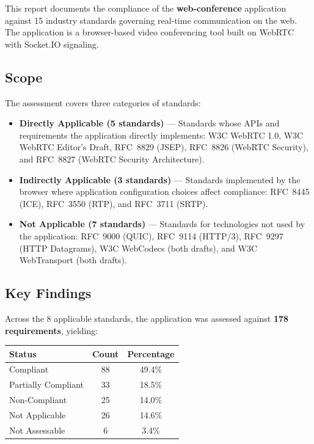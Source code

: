 \documentclass[11pt,letterpaper]{article}
\begin{document}
This report documents the compliance of the \textbf{web-conference} application against 15 industry standards governing real-time communication on the web. The application is a browser-based video conferencing tool built on WebRTC with Socket.IO signaling.

\subsection{Scope}

The assessment covers three categories of standards:

\begin{itemize}[leftmargin=2em]
    \item \textbf{Directly Applicable (5 standards)} --- Standards whose APIs and requirements the application directly implements: W3C WebRTC 1.0, W3C WebRTC Editor's Draft, RFC~8829 (JSEP), RFC~8826 (WebRTC Security), and RFC~8827 (WebRTC Security Architecture).
    \item \textbf{Indirectly Applicable (3 standards)} --- Standards implemented by the browser where application configuration choices affect compliance: RFC~8445 (ICE), RFC~3550 (RTP), and RFC~3711 (SRTP).
    \item \textbf{Not Applicable (7 standards)} --- Standards for technologies not used by the application: RFC~9000 (QUIC), RFC~9114 (HTTP/3), RFC~9297 (HTTP Datagrams), W3C WebCodecs (both drafts), and W3C WebTransport (both drafts).
\end{itemize}

\subsection{Key Findings}

Across the 8 applicable standards, the application was assessed against \textbf{178 requirements}, yielding:

\begin{center}
\begin{tabular}{lcc}
\toprule
\textbf{Status} & \textbf{Count} & \textbf{Percentage} \\
\midrule
\rowcolor{compliant!15} Compliant & 88 & 49.4\% \\
\rowcolor{partial!15} Partially Compliant & 33 & 18.5\% \\
\rowcolor{noncompliant!15} Non-Compliant & 25 & 14.0\% \\
\rowcolor{notapplicable!10} Not Applicable & 26 & 14.6\% \\
Not Assessable & 6 & 3.4\% \\
\bottomrule
\end{tabular}
\end{center}
\end{document}
